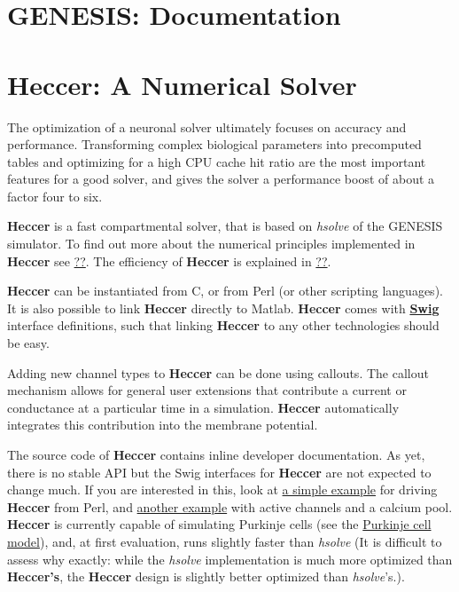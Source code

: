 \documentclass[12pt]{article}
\begin{document}
\section*{GENESIS: Documentation}

\section*{Heccer: A Numerical Solver}

%

%

The optimization of a neuronal solver ultimately focuses on accuracy and performance. Transforming complex biological parameters into precomputed tables and optimizing for a high CPU cache hit ratio are the most important features for a good solver, and gives the solver a performance boost of about a factor four to six.

{\bf Heccer} is a fast compartmental solver, that is based on {\it hsolve} of the GENESIS simulator. To find out more about the numerical principles implemented in {\bf Heccer} see \href{}{??}. The efficiency of {\bf Heccer} is explained in \href{}{??}.

{\bf Heccer} can be instantiated from C, or from Perl (or other scripting languages). It is also possible to link {\bf Heccer} directly to Matlab. {\bf Heccer} comes with \href{http://www.swig.org/}{\bf Swig} interface definitions, such that linking {\bf Heccer} to any other technologies should be easy.

Adding new channel types to {\bf Heccer} can be done using callouts. The callout mechanism allows for general user extensions that contribute a current or conductance at a particular time in a simulation. {\bf Heccer} automatically integrates this contribution into the membrane potential.

The source code of {\bf Heccer} contains inline developer documentation. As yet, there is no stable API but the Swig interfaces for {\bf Heccer} are not expected to change much. If you are interested in this, look at \href{}{a simple example} for driving {\bf Heccer} from Perl, and \href{}{another example} with active channels and a calcium pool. {\bf Heccer} is currently capable of simulating Purkinje cells (see the \href{../purkinje-cell-model/purkinje-cell-model.tex}{Purkinje cell model}), and, at first evaluation, runs slightly faster than {\it hsolve} (It is difficult to assess why exactly: while the {\it hsolve} implementation is much more optimized than {\bf Heccer's}, the {\bf Heccer} design is slightly better optimized than {\it hsolve}'s.).
\end{document}
